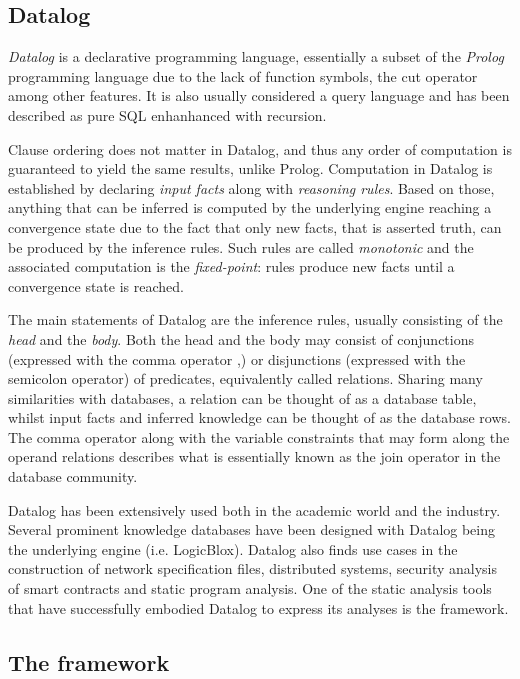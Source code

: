\subsection{Datalog}

\textit{Datalog} is a declarative programming language, essentially a subset of the  \textit{Prolog}
programming language due to the lack of function symbols, the cut operator among
other features. It is also usually considered a query language and has been described
as pure SQL enhanhanced with recursion.

Clause ordering does not matter in Datalog, and thus any order of computation is
guaranteed to yield the same results, unlike Prolog. Computation in Datalog is
established by declaring \textit{input facts} along with \textit{reasoning rules}. Based on those,
anything that can be inferred is computed by the underlying engine reaching
a convergence state due to the fact that only new facts, that is asserted truth,
can be produced by the inference rules. Such rules are called \textit{monotonic} and
the associated computation is the \emph{fixed-point}: rules produce new facts
until a convergence state is reached.

The main statements of Datalog are the inference rules, usually consisting of
the \emph{head} and the \emph{body}.
Both the head and the body
may consist of conjunctions (expressed with the comma operator ,) or
disjunctions (expressed with the semicolon operator) of predicates, equivalently called
relations. Sharing many similarities with databases, a relation can be thought
of as a database table, whilst input facts and inferred knowledge can be thought of as
the database rows. The comma operator along with the variable constraints that
may form along the operand relations describes what is essentially known
as the join operator in the database community.

Datalog has been extensively used both in the academic world and the industry. Several
prominent knowledge databases have been designed with Datalog being the underlying engine
(i.e. LogicBlox). Datalog also finds use cases in the construction of network
specification files, distributed systems, security analysis of
smart contracts\cite{grech2018madmax}
and static program analysis. One of the
static analysis tools that have successfully embodied Datalog to express its analyses
is the \doop{} framework.

\subsection{The \doop{} framework}

